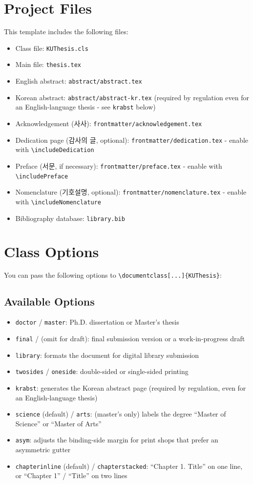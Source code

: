 \section{Project Files}
This template includes the following files:
\begin{itemize}
  \item Class file: \texttt{KUThesis.cls}
  \item Main file: \texttt{thesis.tex}
  \item English abstract: \texttt{abstract/abstract.tex}
  \item Korean abstract: \texttt{abstract/abstract-kr.tex} (required by regulation even for an English-language thesis - see \texttt{krabst} below)
  \item Acknowledgement (사사): \texttt{frontmatter/acknowledgement.tex}
  \item Dedication page (감사의 글, optional): \texttt{frontmatter/dedication.tex} - enable with \verb|\includeDedication|
  \item Preface (서문, if necessary): \texttt{frontmatter/preface.tex} - enable with \verb|\includePreface|
  \item Nomenclature (기호설명, optional): \texttt{frontmatter/nomenclature.tex} - enable with \verb|\includeNomenclature|
  \item Bibliography database: \texttt{library.bib}
\end{itemize}

\section{Class Options}
You can pass the following options to \verb|\documentclass[...]{KUThesis}|:

\subsection{Available Options}
\begin{itemize}
  \item \texttt{doctor} / \texttt{master}: Ph.D. dissertation or Master's thesis
  \item \texttt{final} / (omit for draft): final submission version or a work-in-progress draft
  \item \texttt{library}: formats the document for digital library submission
  \item \texttt{twosides} / \texttt{oneside}: double-sided or single-sided printing
  \item \texttt{krabst}: generates the Korean abstract page (required by regulation, even for an English-language thesis)
  \item \texttt{science} (default) / \texttt{arts}: (master's only) labels the degree ``Master of Science'' or ``Master of Arts''
  \item \texttt{asym}: adjusts the binding-side margin for print shops that prefer an asymmetric gutter
  \item \texttt{chapterinline} (default) / \texttt{chapterstacked}: ``Chapter 1. Title'' on one line, or ``Chapter 1'' / ``Title'' on two lines
\end{itemize}

